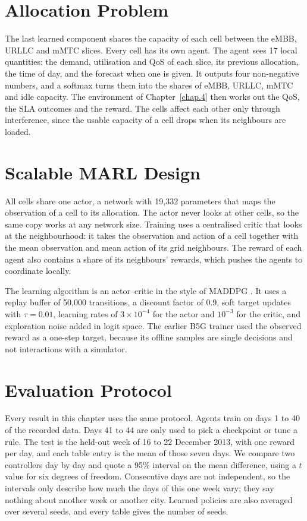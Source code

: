 \label{chap.7}
\section{Allocation Problem}
\label{sec:allocation_problem}
The last learned component shares the capacity of each cell between the eMBB, URLLC and mMTC slices. Every cell has its own agent. The agent sees 17 local quantities: the demand, utilisation and QoS of each slice, its previous allocation, the time of day, and the forecast when one is given. It outputs four non-negative numbers, and a softmax turns them into the shares of eMBB, URLLC, mMTC and idle capacity. The environment of Chapter~\ref{chap.4} then works out the QoS, the SLA outcomes and the reward. The cells affect each other only through interference, since the usable capacity of a cell drops when its neighbours are loaded.

\section{Scalable MARL Design}
\label{sec:scalable_marl}
All cells share one actor, a network with 19{,}332 parameters that maps the observation of a cell to its allocation. The actor never looks at other cells, so the same copy works at any network size. Training uses a centralised critic that looks at the neighbourhood: it takes the observation and action of a cell together with the mean observation and mean action of its grid neighbours. The reward of each agent also contains a share of its neighbours' rewards, which pushes the agents to coordinate locally.

The learning algorithm is an actor--critic in the style of MADDPG \cite{lowe2017}. It uses a replay buffer of 50{,}000 transitions, a discount factor of 0.9, soft target updates with $\tau=0.01$, learning rates of $3\times10^{-4}$ for the actor and $10^{-3}$ for the critic, and exploration noise added in logit space. The earlier B5G trainer used the observed reward as a one-step target, because its offline samples are single decisions and not interactions with a simulator.

\section{Evaluation Protocol}
\label{sec:marl_protocol}
Every result in this chapter uses the same protocol. Agents train on days 1 to 40 of the recorded data. Days 41 to 44 are only used to pick a checkpoint or tune a rule. The test is the held-out week of 16 to 22 December 2013, with one reward per day, and each table entry is the mean of those seven days. We compare two controllers day by day and quote a 95\% interval on the mean difference, using a $t$ value for six degrees of freedom. Consecutive days are not independent, so the intervals only describe how much the days of this one week vary; they say nothing about another week or another city. Learned policies are also averaged over several seeds, and every table gives the number of seeds.

